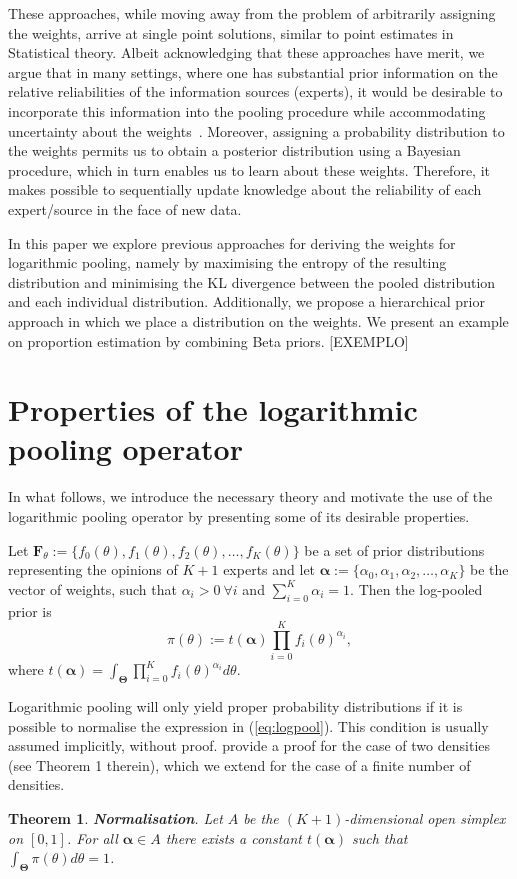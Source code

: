 \documentclass[a4paper, notitlepage, 10pt]{article}
\newtheorem{theo}{Theorem}[]
\begin{document}
These approaches, while moving away from the problem of arbitrarily assigning the weights, arrive at single point solutions, similar to point estimates in Statistical theory.
Albeit acknowledging that these approaches have merit, we argue that in many settings, where one has substantial prior information on the relative reliabilities of the information sources (experts), it would be desirable to incorporate this information into the pooling procedure while accommodating uncertainty about the weights~\citep{poole2000}.
Moreover, assigning a probability distribution to the weights permits us to obtain a posterior distribution using a Bayesian procedure, which in turn enables us to learn about these weights.
Therefore, it makes possible to sequentially update knowledge about the reliability of each expert/source in the face of new data.

In this paper we explore previous approaches for deriving the weights for logarithmic pooling, namely by maximising the entropy of the resulting distribution and minimising the KL divergence between the pooled distribution and each individual distribution.
Additionally, we propose a hierarchical prior approach in which we place a distribution on the weights.
We present an example on proportion estimation by combining Beta priors.
[EXEMPLO]

\section*{Properties of the logarithmic pooling operator}

In what follows, we introduce the necessary theory and motivate the use of the logarithmic pooling operator by presenting some of its desirable properties.

Let $\mathbf{F}_{\theta} := \{f_0(\theta), f_1(\theta), f_2(\theta), \ldots, f_K(\theta)\}$ be a set of prior distributions representing the opinions of $K+1$ experts and let $\boldsymbol\alpha :=\{\alpha_0, \alpha_1, \alpha_2, \ldots, \alpha_K \}$ be the vector of weights, such that $\alpha_i > 0\: \forall i$ and $\sum_{i=0}^K \alpha_i = 1$.
Then the log-pooled prior is
\begin{equation}
\label{eq:logpool}
 \pi(\theta) := t(\boldsymbol\alpha) \prod_{i=0}^K f_i(\theta)^{\alpha_i},
\end{equation}
where $t(\boldsymbol\alpha) = \int_{\boldsymbol\Theta}\prod_{i=0}^K f_i(\theta)^{\alpha_i}d\theta$.

Logarithmic pooling will only yield proper probability distributions if it is possible to normalise the expression in (\ref{eq:logpool}).
This condition is usually assumed implicitly, without proof.
\citet{poole2000} provide a proof for the case of two densities (see Theorem 1 therein), which we extend for the case of a finite number of densities.
\begin{theo}
\label{thm:normalisation}
\textbf{Normalisation}. 
Let $A$ be the $(K+1)$-dimensional open simplex on $[0,1]$.
For all $\boldsymbol\alpha \in A$ there exists a constant $t(\boldsymbol\alpha)$ such that $\int_{\boldsymbol\Theta}\pi(\theta)d\theta = 1$.
\end{theo}
\end{document}
